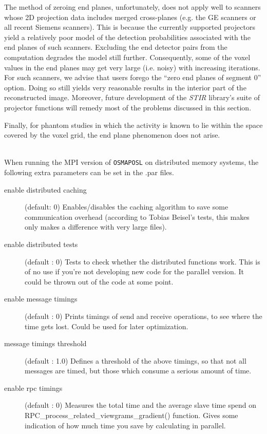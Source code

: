 \documentclass{article}
\begin{document}
The method of zeroing end planes, unfortunately, does not apply 
well to scanners whose 2D projection data includes merged cross-planes 
(e.g. the GE scanners or all recent Siemens scanners). 
This is because the currently supported 
projectors yield a relatively poor model of the detection probabilities 
associated with the end planes of such scanners. Excluding the 
end detector pairs from the computation degrades the model still 
further. Consequently, some of the voxel values in the end planes 
may get very large (i.e. noisy) with increasing iterations. For such scanners, we 
advise that users forego the ``zero end planes of segment 0'' 
option. Doing so still yields very reasonable results in the 
interior part of the reconstructed image. Moreover, future development 
of the \textit{STIR} library's suite of projector functions will remedy 
most of the problems discussed in this section.


Finally, for phantom studies in which the activity is known to 
lie within the space covered by the voxel grid, the end plane 
phenomenon does not arise.

{}\\
When running the MPI version of \texttt{OSMAPOSL} on distributed memory
systems, the following extra parameters can be set in the .par files.

\begin{description}
\item[enable distributed caching] (default: 0)
Enables/disables the caching algorithm to save some communication overhead (according
to Tobias Beisel's tests, this makes only makes a difference with very large files). 

\item[enable distributed tests] (default : 0)
Tests to check whether the distributed functions work. This is of no use if you're 
not developing new code for the parallel version. It could be thrown out of the code at some point.

\item[enable message timings] (default : 0)
Prints timings of send and receive operations, to see where the time gets lost. 
Could be used for later optimization. 

\item[message timings threshold] (default : 1.0)
Defines a threshold of the above timings, so that not all messages are timed, but those which 
consume a serious amount of time. 

\item[enable rpc timings] (default : 0)
Measures the total time and the average slave time spend on RPC\_process\_related\_viewgrams\_gradient() function. 
Gives some indication of how much time you save by calculating in parallel. 
\end{description}
\end{document}

